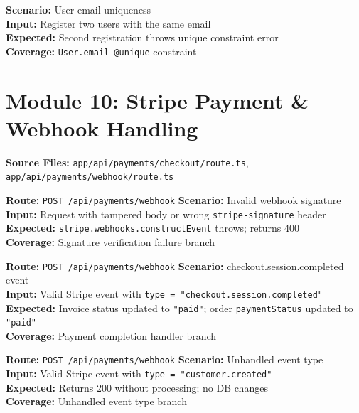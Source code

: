 ﻿\documentclass[12pt,a4paper]{report}
\newcommand{\pone}{\textbf{\color{p1red}P1}}
\newcommand{\ptwo}{\textbf{\color{p2orange}P2}}
\begin{document}
\begin{tcolorbox}[testbox,title={DB-005 \hfill \ptwo}]
\textbf{Scenario:} User email uniqueness \\
\textbf{Input:} Register two users with the same email \\
\textbf{Expected:} Second registration throws unique constraint error \\
\textbf{Coverage:} \texttt{User.email @unique} constraint
\end{tcolorbox}

\section{Module 10: Stripe Payment \& Webhook Handling}

\textbf{Source Files:} \texttt{app/api/payments/checkout/route.ts}, \texttt{app/api/payments/webhook/route.ts}

\begin{tcolorbox}[criticalbox,title={STRIPE-001 \hfill \pone\ --- Webhook Signature}]
\textbf{Route:} \texttt{POST /api/payments/webhook} \quad \textbf{Scenario:} Invalid webhook signature \\
\textbf{Input:} Request with tampered body or wrong \texttt{stripe-signature} header \\
\textbf{Expected:} \texttt{stripe.webhooks.constructEvent} throws; returns 400 \\
\textbf{Coverage:} Signature verification failure branch
\end{tcolorbox}

\begin{tcolorbox}[testbox,title={STRIPE-002 \hfill \pone}]
\textbf{Route:} \texttt{POST /api/payments/webhook} \quad \textbf{Scenario:} checkout.session.completed event \\
\textbf{Input:} Valid Stripe event with \texttt{type = "checkout.session.completed"} \\
\textbf{Expected:} Invoice status updated to \texttt{"paid"}; order \texttt{paymentStatus} updated to \texttt{"paid"} \\
\textbf{Coverage:} Payment completion handler branch
\end{tcolorbox}

\begin{tcolorbox}[testbox,title={STRIPE-003 \hfill \ptwo}]
\textbf{Route:} \texttt{POST /api/payments/webhook} \quad \textbf{Scenario:} Unhandled event type \\
\textbf{Input:} Valid Stripe event with \texttt{type = "customer.created"} \\
\textbf{Expected:} Returns 200 without processing; no DB changes \\
\textbf{Coverage:} Unhandled event type branch
\end{tcolorbox}
\end{document}
